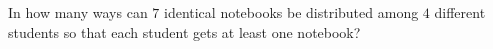 In how many ways can $7$ identical notebooks be distributed among $4$ different students so that each student gets at least one notebook?
